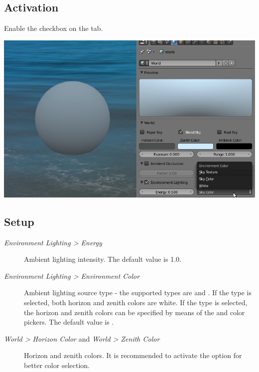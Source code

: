 \documentclass[a4paper,12pt,oneside]{sphinxmanual}
\begin{document}
\subsection{Activation}
\label{lighting:id6}
Enable the  checkbox on the  tab.

{\hfill\includegraphics[width=1.000\linewidth]{lighting_environment.jpg}\hfill}


\subsection{Setup}
\label{lighting:id7}\begin{description}
\item[{\emph{Environment Lighting \textgreater{} Energy}}] \leavevmode
Ambient lighting intensity. The default value is 1.0.

\item[{\emph{Environment Lighting \textgreater{} Environment Color}}] \leavevmode
Ambient lighting source type - the supported types are  and . If the  type is selected, both horizon and zenith colors are white. If the  type is selected, the horizon and zenith colors can be specified by means of the  and  color pickers. The default value is .

\item[{\emph{World \textgreater{} Horizon Color} and \emph{World \textgreater{} Zenith Color}}] \leavevmode
Horizon and zenith colors. It is recommended to activate the  option for better color selection.

\end{description}
\end{document}
